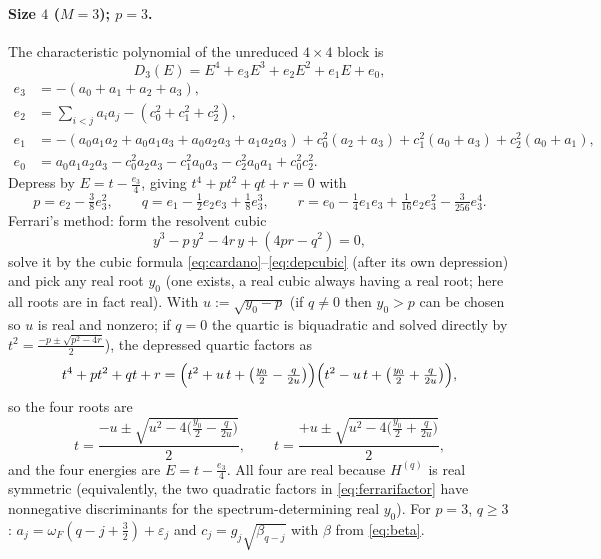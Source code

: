 \documentclass[12pt]{article}
\theoremstyle{definition}
\theoremstyle{remark}
\begin{document}
\paragraph{Size $4$ ($M=3$); $p=3$.} The characteristic polynomial of the unreduced
$4\times4$ block is
\[
D_3(E)=E^4+e_3E^3+e_2E^2+e_1E+e_0,
\]
\begin{align*}
e_3&=-(a_0+a_1+a_2+a_3),\\
e_2&=\textstyle\sum_{i<j}a_ia_j-(c_0^2+c_1^2+c_2^2),\\
e_1&=-(a_0a_1a_2+a_0a_1a_3+a_0a_2a_3+a_1a_2a_3)
     +c_0^2(a_2+a_3)+c_1^2(a_0+a_3)+c_2^2(a_0+a_1),\\
e_0&=a_0a_1a_2a_3-c_0^2a_2a_3-c_1^2a_0a_3-c_2^2a_0a_1+c_0^2c_2^2 .
\end{align*}
Depress by $E=t-\tfrac{e_3}{4}$, giving $t^4+pt^2+qt+r=0$ with
\begin{equation}\label{eq:depquartic}
p=e_2-\tfrac{3}{8}e_3^2,\qquad
q=e_1-\tfrac12 e_2e_3+\tfrac18 e_3^3,\qquad
r=e_0-\tfrac14 e_1e_3+\tfrac{1}{16}e_2e_3^2-\tfrac{3}{256}e_3^4 .
\end{equation}
Ferrari's method: form the resolvent cubic
\begin{equation}\label{eq:resolvent}
y^3-p\,y^2-4r\,y+(4pr-q^2)=0,
\end{equation}
solve it by the cubic formula \eqref{eq:cardano}--\eqref{eq:depcubic} (after its own
depression) and pick any real root $y_0$ (one exists, a real cubic always having a
real root; here all roots are in fact real). With $u:=\sqrt{y_0-p}$ (if $q\ne0$ then
$y_0>p$ can be chosen so $u$ is real and nonzero; if $q=0$ the quartic is biquadratic
and solved directly by $t^2=\tfrac{-p\pm\sqrt{p^2-4r}}{2}$), the depressed quartic
factors as
\begin{equation}\label{eq:ferrarifactor}
t^4+pt^2+qt+r=\Bigl(t^2+u\,t+\bigl(\tfrac{y_0}{2}-\tfrac{q}{2u}\bigr)\Bigr)
\Bigl(t^2-u\,t+\bigl(\tfrac{y_0}{2}+\tfrac{q}{2u}\bigr)\Bigr),
\end{equation}
so the four roots are
\begin{equation}\label{eq:ferrariroots}
t=\frac{-u\pm\sqrt{u^2-4\bigl(\tfrac{y_0}{2}-\tfrac{q}{2u}\bigr)}}{2},\qquad
t=\frac{+u\pm\sqrt{u^2-4\bigl(\tfrac{y_0}{2}+\tfrac{q}{2u}\bigr)}}{2},
\end{equation}
and the four energies are $E=t-\tfrac{e_3}{4}$. All four are real because $H^{(q)}$
is real symmetric (equivalently, the two quadratic factors in
\eqref{eq:ferrarifactor} have nonnegative discriminants for the spectrum-determining
real $y_0$). For $p=3$, $q\ge3$: $a_j=\omega_F(q-j+\tfrac32)+\varepsilon_j$ and
$c_j=g_j\sqrt{\beta_{q-j}}$ with $\beta$ from \eqref{eq:beta}.
\end{document}
